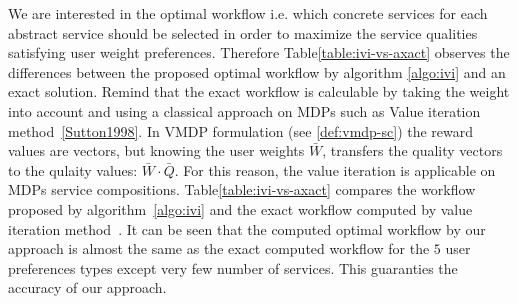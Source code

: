 \documentclass[10pt,journal,compsoc]{IEEEtran}
\begin{document}
We are interested in the optimal workflow i.e. which concrete services for each abstract service should be selected in order to maximize the service qualities satisfying user weight preferences. Therefore Table\ref{table:ivi-vs-axact} observes the differences between the proposed optimal workflow by algorithm \ref{algo:ivi} and an exact solution. Remind that the exact workflow is calculable by taking the weight into account and using a classical approach on MDPs such as Value iteration method~\ref{Sutton1998}.  In VMDP formulation (see \ref{def:vmdp-sc}) the reward values are vectors, but knowing the user weights $\bar{W}$, transfers the quality vectors to the qulaity values: $\bar{W} \cdot \bar{Q}$. For this reason, the value iteration is applicable on MDPs service compositions. Table\ref{table:ivi-vs-axact} compares the workflow proposed by algorithm~\ref{algo:ivi} and the exact workflow computed by value iteration method~\cite{ARASI2017}. It can be seen that the computed optimal workflow by our approach is almost the same as the exact computed workflow for the $5$ user preferences types except very few number of services. This guaranties the accuracy of our approach. 
\end{document}

